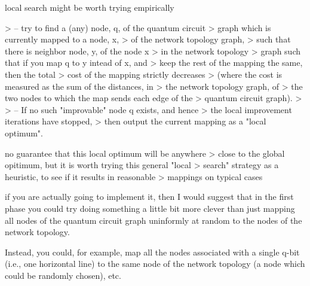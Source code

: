 local search might be worth trying empirically 

> -- try to find a (any) node, q, of the quantum circuit
>     graph which is currently mapped to a node, x,
>     of the network topology graph,
>     such that there is neighbor node, y, of the node x
>     in the network topology
>     graph such that if you map q to y intead of x, and
>     keep the rest of the mapping the same, then the total
>     cost of the mapping strictly decreases
>     (where the cost is measured as the sum of the distances, in
>      the network topology graph, of
>      the two nodes to which the map sends each edge of the
>      quantum circuit graph).
>
> -- If no such "improvable" node q exists, and hence
>     the local improvement iterations have stopped,
>     then output the current mapping as a "local optimum".


 no guarantee that this local optimum will be anywhere
> close to the global opitimum, but it is worth trying this general "local
> search" strategy as a heuristic, to see if it results in reasonable
> mappings on typical cases


if you are actually going to implement it, then I would suggest that in
the first phase you could try doing something a little bit more clever
than just mapping all nodes of the quantum circuit graph uninformly at
random to the nodes of the network topology.

Instead, you could, for example, map all the nodes associated with
a single q-bit (i.e., one horizontal line) to the same node of
the network topology (a node which could be randomly chosen), etc.